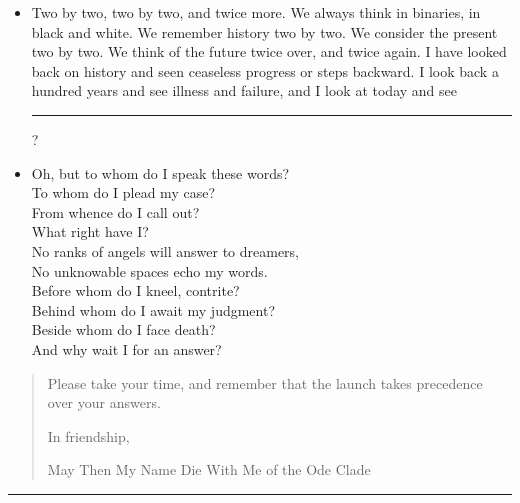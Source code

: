 \begin{itemize}
\item
  Two by two, two by two, and twice more. We always think in binaries, in black and white. We remember history two by two. We consider the present two by two. We think of the future twice over, and twice again. I have looked back on history and seen ceaseless progress or steps backward. I look back a hundred years and see illness and failure, and I look at today and see \rule{5em}{0.75pt}?
\item
  Oh, but to whom do I speak these words?\\
  To whom do I plead my case?\\
  From whence do I call out?\\
  What right have I?\\
  No ranks of angels will answer to dreamers,\\
  No unknowable spaces echo my words.\\
  Before whom do I kneel, contrite?\\
  Behind whom do I await my judgment?\\
  Beside whom do I face death?\\
  And why wait I for an answer?
\end{itemize}

\begin{quote}
Please take your time, and remember that the launch takes precedence over your answers.

In friendship,

May Then My Name Die With Me of the Ode Clade
\end{quote}

\begin{center}\rule{0.5\linewidth}{0.5pt}\end{center}

\newpage

